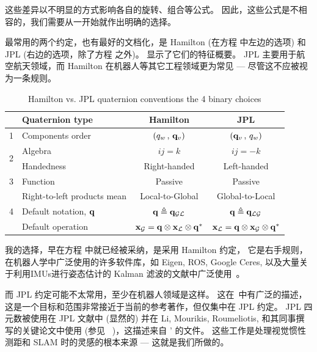 这些差异以不明显的方式影响各自的旋转、组合等公式。 
因此，这些公式是不相容的，我们需要从一开始就作出明确的选择。

最常用的两个约定，也有最好的文档化，是 Hamilton (在方程  中左边的选项) 和 JPL (右边的选项，除了方程  之外)。
  显示了它们的特征概要。 
JPL 主要用于航空航天领域，而 Hamilton 在机器人等其它工程领域更为常见 --- 尽管这不应被视为一条规则。


\begin{table}
\renewcommand{\arraystretch}{1.3}
\centering
\caption{Hamilton vs. JPL quaternion conventions \wrt the 4 binary choices}
\vspace{1ex}
\begin{tabular}{|cl|c|c|}
\hline
& Quaternion type & Hamilton & JPL \\
\hline\hline
1 & Components order & $(q_w \,,\, {\bf q}_v)$ & $({\bf q}_v \,,\, q_w)$ \\
\hline
\multirow{2}{*}{2} & Algebra & $ij=k$ & $ij=-k$ \\
& Handedness & Right-handed & Left-handed \\
\hline
3 & Function & Passive & Passive
\\
\hline
\multirow{3}{*}{4} & Right-to-left products mean & Local-to-Global & Global-to-Local \\
& Default notation, ${\bf q}$ & ${\bf q} \triangleq {\bf q}_{\mathcal{G}\mathcal{L}}$ & ${\bf q} \triangleq {\bf q}_{\mathcal{L}\mathcal{G}}$ \\
& Default operation & ${\bf x}_{\mathcal{G}} = {\bf q}\otimes{\bf x}_{\mathcal{L}}\otimes{\bf q}^*$ & ${\bf x}_{\mathcal{L}} = {\bf q}\otimes{\bf x}_{\mathcal{G}}\otimes{\bf q}^*$ \\
\hline
\end{tabular}
\label{tab:Hamilton_vs_JPL}
\end{table}

我的选择，早在方程  中就已经被采纳，是采用 Hamilton 约定， 
它是右手规则，在机器人学中广泛使用的许多软件库，如 Eigen, ROS, Google Ceres, 
以及大量关于利用IMUs进行姿态估计的 Kalman 滤波的文献中广泛使用~\citep[还有更多其它的例子]{CHOU-92,KUIPERS-99,PINIES-07,ROUSSILLON-11a,MARTINELLI-12}。

而 JPL 约定可能不太常用，至少在机器人领域是这样。 
这在~\citep{TRAWNY-05-QUAT}中有广泛的描述，这是一个目标和范围非常接近于当前的参考著作，但仅集中在 JPL 约定。 
JPL 四元数被使用在 JPL 文献中 (显然的) 并在 Li, Mourikis, Roumeliotis, 和其同事撰写的关键论文中使用 (参见 \eg~\citep{LI-2012,LI-14})，这描述来自 \citeauthor{TRAWNY-05-QUAT}' 的文件。 
这些工作是处理视觉惯性测距和 SLAM 时的灵感的根本来源 --- 这就是我们所做的。 

